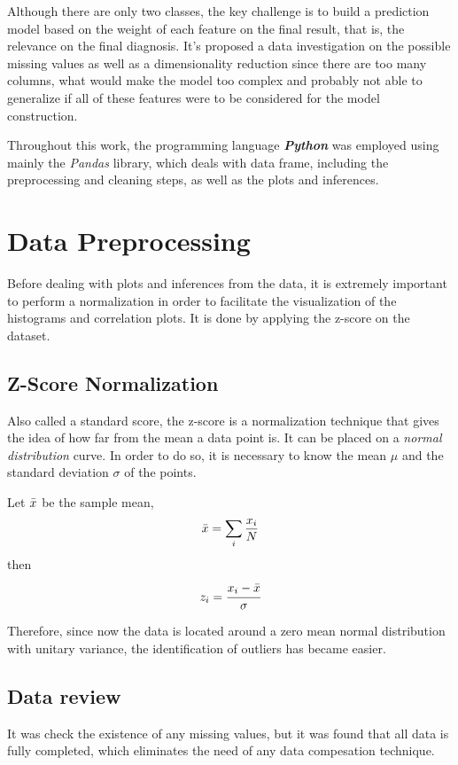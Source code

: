 \documentclass[conference]{IEEEtran}
\begin{document}
Although there are only two classes, the key challenge is to build a prediction
model based on the weight of each feature on the final result, that is, the relevance
on the final diagnosis. It's proposed a data investigation on the possible missing values as 
well as a dimensionality reduction since there are too many columns, what would 
make the model too complex and probably not able to generalize if all of these 
features were to be considered for the model construction. 

Throughout this work, the programming language \textit{\textbf{Python}} was employed using mainly the \textit{Pandas} library, which deals with data frame, including the preprocessing and cleaning steps, as well as the plots and inferences. 

\section{Data Preprocessing}
Before dealing with plots and inferences from the data, it is extremely important to perform a normalization in order to facilitate the visualization of the histograms and correlation plots. It is done by applying the z-score on the dataset.

\subsection{Z-Score Normalization}

Also called a standard score, the z-score is a normalization technique that gives the idea of how far from the mean a data point is. It can be placed on a \textit{normal distribution} curve. In order to do so, it is necessary to know the mean $\mu$ and the standard deviation $\sigma$ of the points.

Let $\Bar{x}$ be the sample mean,
$$\Bar{x} = \sum_i \frac{x_i}{N}$$
then
$$z_i = \cfrac{x_i - \Bar{x}}{\sigma}$$

Therefore, since now the data is located around a zero mean normal distribution with unitary variance, the identification of outliers has became easier. 

\subsection{Data review}\label{AA}
It was check the existence of any missing values, but it was found that all data is fully completed, which eliminates the need of any data compesation technique.
\end{document}
